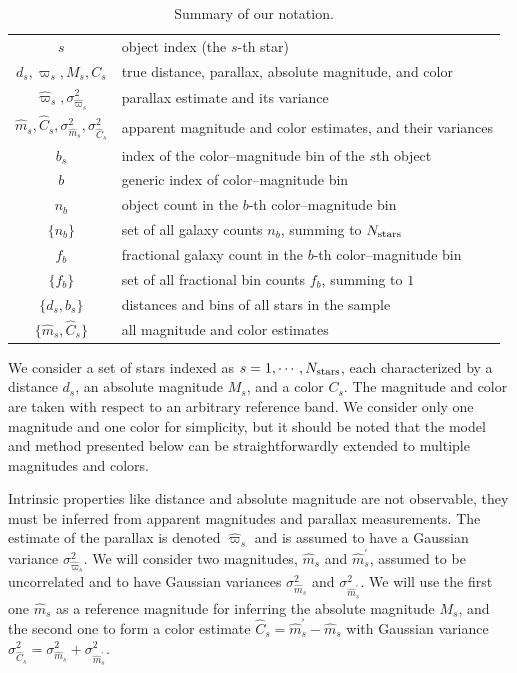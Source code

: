\documentclass[manuscript, letterpaper]{aastex6}
\newcommand{\nobj}{{N_{\rm stars}}}
\begin{document}
\begin{table} %
\centering
\begin{tabular}{cl}
\hline
$s$	&	object index (the $s$-th star)\\
$d_s, \varpi_s, M_s, C_s$	&	true distance, parallax, absolute magnitude, and color	\\
$\hat{\varpi}_s, \sigma_{\hat{\varpi}_s}^2$ 	&	parallax estimate and its variance\\
$\hat{m}_s, \hat{C}_s, \sigma^2_{\hat{m}_s}, \sigma^2_{\hat{C}_s}$ 	&	apparent magnitude and color estimates, and their variances\\
$b_s$	&	index of the color--magnitude bin of the $s$th object\\
\hline
$b$	&	generic index of color--magnitude bin\\
$n_b$	& 	object count in the $b$-th color--magnitude bin  \\
$\{n_b\}$	&	set of all galaxy counts $n_b$, summing to $\nobj$\\
$f_b$	&	fractional galaxy count in the $b$-th color--magnitude bin  \\
$\{f_b\}$	&	set of all fractional bin counts $f_b$, summing to $1$\\
$\{ d_s, b_s\}$	&	distances and bins of all stars in the sample	\\
$\{ \hat{m}_s, \hat{C}_s \}$ &	all magnitude and color estimates\\
\hline
\end{tabular}
\caption{Summary of our notation. }
\label{tab:notation}
\end{table} 

We consider a set of stars indexed as $s=1, \cdots, \nobj$, each characterized by a distance $d_s$, an absolute magnitude $M_s$, and a color $C_s$. 
The magnitude and color are taken with respect to an arbitrary reference band.
We consider only one magnitude and one color for simplicity, but it should be noted that the model and method presented below can be straightforwardly extended to multiple magnitudes and colors.

Intrinsic properties like distance and absolute magnitude are not observable, they must be inferred from apparent magnitudes and parallax measurements.  
The estimate of the parallax is denoted $\hat{\varpi}_s$ and is assumed to have a Gaussian variance $\sigma_{\hat{\varpi}_s}^2$.
We will consider two magnitudes, $\hat{m}_s$ and $\hat{m}^\prime_s$, assumed to be uncorrelated and to have Gaussian variances $\sigma_{\hat{m}_s}^2$ and $\sigma_{\hat{m}^\prime_s}^2$.
We will use the first one $\hat{m}_s$ as a reference magnitude for inferring the absolute magnitude $M_s$, and the second one to form a color estimate $\hat{C}_s =\hat{m}^\prime_s - \hat{m}_s $ with Gaussian variance $\sigma_{\hat{C}_s}^2 = \sigma_{\hat{m}_s}^2 + \sigma_{\hat{m}^\prime_s}^2$.
\end{document}
